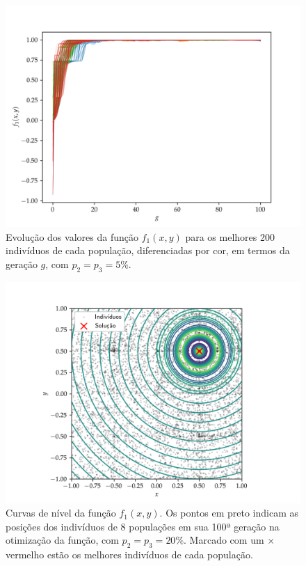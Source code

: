 \begin{figure}[p]
  \centering
  \includegraphics[width=\textwidth]{imagens/low_prob/evolution_damped_cossine.png}
  \caption{
    Evolução dos valores da função $ f_1(x,y) $ para os
    melhores 200 indivíduos de cada população, diferenciadas por cor, em termos da geração $g$,
    com $ p_2 = p_3 = 5\% $.
  }
  \label{fig:evolution_damped_cossine}
\end{figure}

\begin{figure}[p]
  \centering
  \includegraphics[width=\textwidth]{imagens/high_prob/contour_damped_cossine.png}
  \caption{
    Curvas de nível da função $f_1(x,y)$. Os pontos em preto indicam as posições dos indivíduos
    de 8 populações em sua 100ª geração na otimização da função, com $ p_2 = p_3 = 20\% $. 
    Marcado com um $\times$ vermelho estão os melhores indivíduos de cada população.
  }
  \label{fig:contour_damped_cossine_mut_20}
\end{figure}

